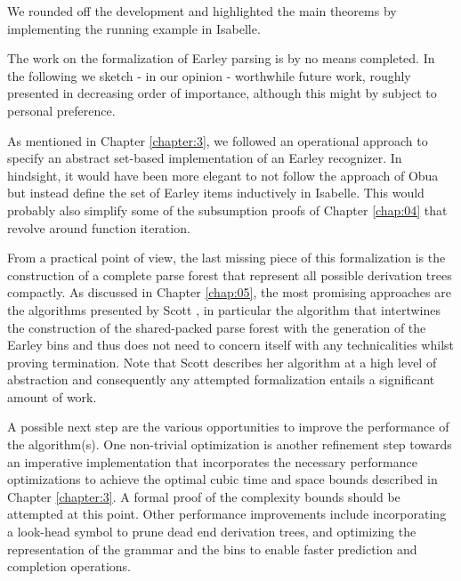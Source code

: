 \begin{isabellebody}
\begin{isamarkuptext}
We rounded off the development and highlighted the main theorems by implementing the running example
in Isabelle.%
\end{isamarkuptext}\isamarkuptrue%
%
\isadelimdocument
%
\endisadelimdocument
%
\isatagdocument
%
\isamarkuptrue%
%
\endisatagdocument
{\isafolddocument}%
%
\isadelimdocument
%
\endisadelimdocument
%
\begin{isamarkuptext}%
The work on the formalization of Earley parsing is by no means completed. In the following
we sketch - in our opinion - worthwhile future work, roughly presented in decreasing order of importance,
although this might by subject to personal preference.

As mentioned in Chapter \ref{chapter:3}, we followed an operational approach to specify an abstract
set-based implementation of an Earley recognizer. In hindsight, it would have been more elegant to not
follow the approach of Obua but instead define the set of Earley items inductively in Isabelle. This
would probably also simplify some of the subsumption proofs of Chapter \ref{chap:04} that revolve around
function iteration.

From a practical point of view, the last missing piece of this formalization is the construction of a
complete parse forest that represent all possible derivation trees compactly. As discussed in Chapter \ref{chap:05},
the most promising approaches are the algorithms presented by Scott \cite{Scott:2008}, in particular
the algorithm that intertwines the construction of the shared-packed parse forest with the generation of
the Earley bins and thus does not need to concern itself with any technicalities whilst proving termination.
Note that Scott describes her algorithm at a high level of abstraction and consequently any attempted
formalization entails a significant amount of work.

A possible next step are the various opportunities to improve the performance of the algorithm(s).
One non-trivial optimization is another refinement step towards an imperative implementation that incorporates the
necessary performance optimizations to achieve the optimal cubic time and space bounds described in
Chapter \ref{chapter:3}. A formal proof of the complexity bounds should be attempted at this point.
Other performance improvements include incorporating a look-head symbol to prune dead end derivation
trees, and optimizing the representation of the grammar and the bins to enable faster prediction and
completion operations.


\end{isamarkuptext}
\end{isabellebody}
